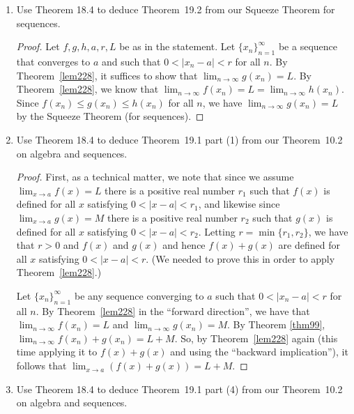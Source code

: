 \documentclass[12pt]{amsart}
\numberwithin{equation}{section}
\theoremstyle{plain} %
\theoremstyle{definition}
\theoremstyle{remark}
\begin{document}
\begin{enumerate}
\item Use Theorem 18.4 to deduce Theorem~19.2 from our Squeeze Theorem for sequences.

\begin{framed}
	\begin{proof}
		Let $f,g,h,a,r,L$ be as in the statement. Let $\{x_n\}_{n=1}^\infty$ be a sequence that converges to $a$ and such that $0<|x_n-a|<r$ for all $n$. By Theorem~\ref{lem228}, it suffices to show that $\lim_{n \to \infty} g(x_n) = L$. By Theorem~\ref{lem228}, we know that $\lim_{n \to \infty} f(x_n) = L=\lim_{n \to \infty} h(x_n)$. Since $f(x_n)\leq g(x_n) \leq h(x_n)$ for all $n$, we have $\lim_{n \to \infty} g(x_n) = L$ by the Squeeze Theorem (for sequences).
		\end{proof}
\end{framed}

\item Use Theorem 18.4 to deduce Theorem~19.1 part (1) from our Theorem~10.2 on algebra and sequences.


\begin{framed}
\begin{proof}
First, as a technical matter, we note that since we assume
	${\lim_{x \to a} f(x) = L}$ there is a positive real number $r_1$ such that $f(x)$ is defined for all $x$ satisfying $0 < |x-a| < r_1$,
	and likewise since
	$\lim_{x \to a} g(x) = M$ there is a positive real number $r_2$ such that $g(x)$ is defined for all $x$ satisfying $0 < |x-a| < r_2$. Letting $r = \min\{r_1, r_2\}$,
	we have that $r > 0$ and $f(x)$ and $g(x)$ and hence $f(x) + g(x)$ are defined for all $x$ satisfying $0 < |x-a| < r$.  (We needed to prove this in order to apply Theorem~\ref{lem228}.)
	
	
	Let $\{x_n\}_{n=1}^\infty$ be any sequence converging to $a$ such that  ${0 < |x_n -a| < r}$ for all $n$. 
	By  Theorem~\ref{lem228} in the ``forward direction'', we have that  $\lim_{n \to \infty} f(x_n) = L$ and $\lim_{n \to \infty} g(x_n) = M$. By Theorem \ref{thm99}, \\
	${\lim_{n \to \infty} f(x_n) +g(x_n) = L + M}$. 
	So, by  Theorem~\ref{lem228} again (this time applying it to $f(x) + g(x)$ and using the ``backward
	implication''), it follows that
	$\lim_{x \to a} (f(x) + g(x)) = L + M$.
\end{proof}
\end{framed}

\item Use Theorem 18.4 to deduce Theorem~19.1 part (4) from our Theorem~10.2 on algebra and sequences.


\end{enumerate}
\end{document}
